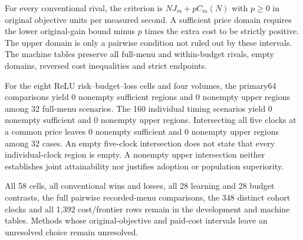 For every conventional rival, the criterion is $N J_m+p C_m(N)$ with $p\geq0$ in original objective units per measured second. A sufficient price domain requires the lower original-gain bound minus $p$ times the extra cost to be strictly positive. The upper domain is only a pairwise condition not ruled out by these intervals. The machine tables preserve all full-menu and within-budget rivals, empty domains, reversed cost inequalities and strict endpoints.

For the eight ReLU risk--budget--loss cells and four volumes, the primary64 comparisons yield 0 nonempty sufficient regions and 0 nonempty upper regions among 32 full-menu scenarios. The 160 individual timing scenarios yield 0 nonempty sufficient and 0 nonempty upper regions. Intersecting all five clocks at a common price leaves 0 nonempty sufficient and 0 nonempty upper regions among 32 cases. An empty five-clock intersection does not state that every individual-clock region is empty. A nonempty upper intersection neither establishes joint attainability nor justifies adoption or population superiority.

All 58 cells, all conventional wins and losses, all 28 learning and 28 budget contrasts, the full pairwise recorded-menu comparisons, the 348 distinct cohort clocks and all 1,392 cost/frontier rows remain in the development and machine tables. Methods whose original-objective and paid-cost intervals leave an unresolved choice remain unresolved.
